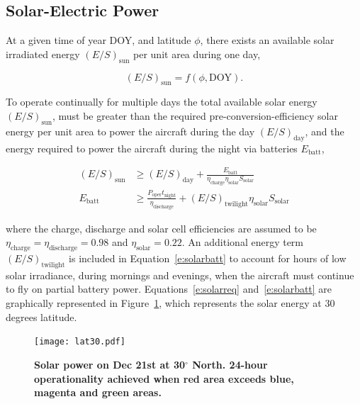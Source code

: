 \subsection{Solar-Electric Power}

At a given time of year DOY, and latitude $\phi$, there exists an available solar irradiated energy $(E/S)_{\text{sun}}$ per unit area during one day,

\begin{equation}
    \label{e:solarfunc}
    (E/S)_{\text{sun}} = f(\phi, \text{DOY}).
\end{equation}

To operate continually for multiple days the total available solar energy $(E/S)_{\text{sun}}$, must be greater than the required pre-conversion-efficiency solar energy per unit area to power the aircraft during the day $(E/S)_{\text{day}}$, and the energy required to power the aircraft during the night via batteries $E_{\text{batt}}$,\cite{solartech}

\begin{align}
    \label{e:solarreq}
    (E/S)_{\text{sun}}  &\geq (E/S)_{\text{day}} + \frac{E_{\text{batt}}}{\eta_{\text{charge}}\eta_{\text{solar}} S_{\text{solar}}} \\
    \label{e:solarbatt}
    E_{\text{batt}} &\geq \frac{P_{\text{oper}}t_{\text{night}}}{\eta_{\text{discharge}}} + (E/S)_{\text{twilight}} \eta_{\text{solar}} S_{\text{solar}}
\end{align}

where the charge, discharge and solar cell efficiencies are assumed to be $\eta_{\text{charge}} = \eta_{\text{discharge}} = 0.98$ and $\eta_{\text{solar}}= 0.22$. 
An additional energy term $(E/S)_{\text{twilight}}$ is included in Equation~\eqref{e:solarbatt} to account for hours of low solar irradiance, during mornings and evenings, when the aircraft must continue to fly on partial battery power. 
Equations~\eqref{e:solarreq} and~\eqref{e:solarbatt} are graphically represented in Figure~\ref{f:lat30}, which represents the solar energy at 30 degrees latitude. 

\begin{figure}[H]
	\begin{center}
	\texttt{[image: lat30.pdf]}
    \caption{\textbf{Solar power on Dec 21st at 30$^{\circ}$ North. 24-hour operationality achieved when red area exceeds blue, magenta and green areas. }}
	\label{f:lat30}
	\end{center}
\end{figure}

